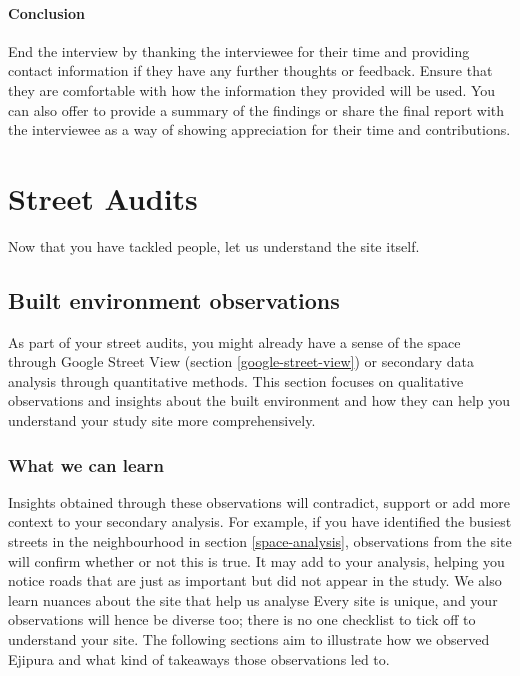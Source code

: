 \documentclass[
]{latex/krantz}
\begin{document}
\hypertarget{conclusion}{%
\paragraph*{Conclusion}\label{conclusion}}

End the interview by thanking the interviewee for their time and providing contact information if they have any further thoughts or feedback. Ensure that they are comfortable with how the information they provided will be used. You can also offer to provide a summary of the findings or share the final report with the interviewee as a way of showing appreciation for their time and contributions.

\hypertarget{street-audits}{%
\section{Street Audits}\label{street-audits}}

Now that you have tackled people, let us understand the site itself.

\hypertarget{built-environment-observations}{%
\subsection{Built environment observations}\label{built-environment-observations}}

As part of your street audits, you might already have a sense of the space through Google Street View (section \ref{google-street-view}) or secondary data analysis through quantitative methods. This section focuses on qualitative observations and insights about the built environment and how they can help you understand your study site more comprehensively.

\hypertarget{learn-observations}{%
\subsubsection{What we can learn}\label{learn-observations}}

Insights obtained through these observations will contradict, support or add more context to your secondary analysis. For example, if you have identified the busiest streets in the neighbourhood in section \ref{space-analysis}, observations from the site will confirm whether or not this is true. It may add to your analysis, helping you notice roads that are just as important but did not appear in the study. We also learn nuances about the site that help us analyse Every site is unique, and your observations will hence be diverse too; there is no one checklist to tick off to understand your site. The following sections aim to illustrate how we observed Ejipura and what kind of takeaways those observations led to.
\end{document}
